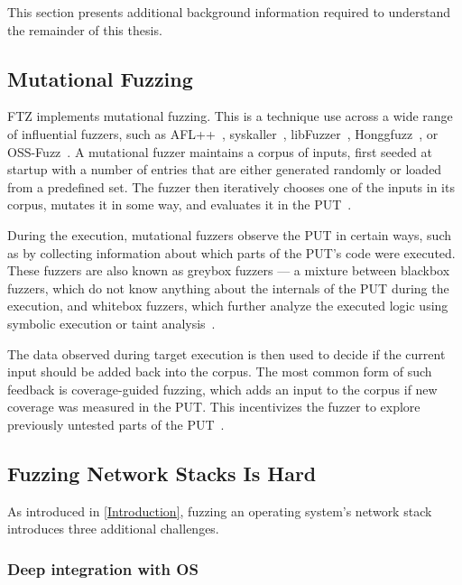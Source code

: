 \documentclass[twocolumn]{article}
\newcommand{\proj}{FTZ\xspace}
\let\savedCite=\cite
\renewcommand{\cite}{\unskip~\savedCite}
\begin{document}
This section presents additional background information required to understand the remainder of this thesis.

\subsection{Mutational Fuzzing}

\label{Background:MutationalFuzzing}
\proj implements mutational fuzzing. This is a technique use across a wide range of influential fuzzers, such as AFL++\cite{AFLPlusPlus}, syskaller\cite{syskaller}, libFuzzer\cite{libFuzzer}, Honggfuzz\cite{hongfuzz}, or OSS-Fuzz\cite{OSSFuzz}. A mutational fuzzer maintains a corpus of inputs, first seeded at startup with a number of entries that are either generated randomly or loaded from a predefined set. The fuzzer then iteratively chooses one of the inputs in its corpus, mutates it in some way, and evaluates it in the PUT\cite{FuzzingBook}.

During the execution, mutational fuzzers observe the PUT in certain ways, such as by collecting information about which parts of the PUT's code were executed. These fuzzers are also known as greybox fuzzers — a mixture between blackbox fuzzers, which do not know anything about the internals of the PUT during the execution, and whitebox fuzzers, which further analyze the executed logic using symbolic execution or taint analysis\cite{Demystifying}.

The data observed during target execution is then used to decide if the current input should be added back into the corpus. The most common form of such feedback is coverage-guided fuzzing, which adds an input to the corpus if new coverage was measured in the PUT. This incentivizes the fuzzer to explore previously untested parts of the PUT\cite{AFLPlusPlus}.

\subsection{Fuzzing Network Stacks Is Hard}
\label{Background:FuzzingNetworkStacksIsHard}

As introduced in \cref{Introduction}, fuzzing an operating system's network stack introduces three additional challenges.

\subsubsection{Deep integration with OS}
\end{document}
